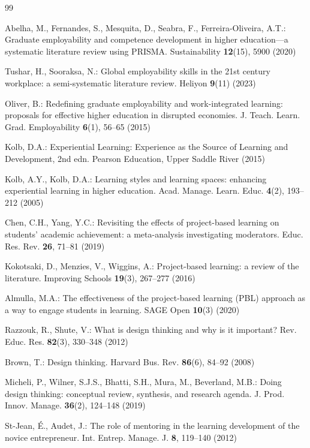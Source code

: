 \documentclass[runningheads]{llncs}
\begin{document}
\begin{thebibliography}{99}

Abelha, M., Fernandes, S., Mesquita, D., Seabra, F., Ferreira-Oliveira, A.T.: Graduate employability and competence development in higher education—a systematic literature review using PRISMA. Sustainability \textbf{12}(15), 5900 (2020)

Tushar, H., Sooraksa, N.: Global employability skills in the 21st century workplace: a semi-systematic literature review. Heliyon \textbf{9}(11) (2023)

Oliver, B.: Redefining graduate employability and work-integrated learning: proposals for effective higher education in disrupted economies. J. Teach. Learn. Grad. Employability \textbf{6}(1), 56–65 (2015)

Kolb, D.A.: Experiential Learning: Experience as the Source of Learning and Development, 2nd edn. Pearson Education, Upper Saddle River (2015)

Kolb, A.Y., Kolb, D.A.: Learning styles and learning spaces: enhancing experiential learning in higher education. Acad. Manage. Learn. Educ. \textbf{4}(2), 193–212 (2005)

Chen, C.H., Yang, Y.C.: Revisiting the effects of project-based learning on students' academic achievement: a meta-analysis investigating moderators. Educ. Res. Rev. \textbf{26}, 71–81 (2019)

Kokotsaki, D., Menzies, V., Wiggins, A.: Project-based learning: a review of the literature. Improving Schools \textbf{19}(3), 267–277 (2016)

Almulla, M.A.: The effectiveness of the project-based learning (PBL) approach as a way to engage students in learning. SAGE Open \textbf{10}(3) (2020)

Razzouk, R., Shute, V.: What is design thinking and why is it important? Rev. Educ. Res. \textbf{82}(3), 330–348 (2012)

Brown, T.: Design thinking. Harvard Bus. Rev. \textbf{86}(6), 84–92 (2008)

Micheli, P., Wilner, S.J.S., Bhatti, S.H., Mura, M., Beverland, M.B.: Doing design thinking: conceptual review, synthesis, and research agenda. J. Prod. Innov. Manage. \textbf{36}(2), 124–148 (2019)

St-Jean, É., Audet, J.: The role of mentoring in the learning development of the novice entrepreneur. Int. Entrep. Manage. J. \textbf{8}, 119–140 (2012)


\end{thebibliography}
\end{document}
